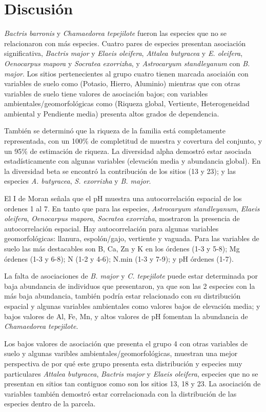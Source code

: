 \documentclass[11pt,]{article}
\begin{document}
\section{Discusión}\label{discusiuxf3n}

\emph{Bactris barronis} y \emph{Chamaedorea tepejilote} fueron las
especies que no se relacionaron con más especies. Cuatro pares de
especies presentan asociación significativa, \emph{Bactris major} y
\emph{Elaeis oleifera}, \emph{Attalea butyracea} y \emph{E. oleifera},
\emph{Oenocarpus mapora} y \emph{Socratea exorrizha}, y
\emph{Astrocaryum standleyanum} con \emph{B. major}. Los sitios
pertenecientes al grupo cuatro tienen marcada asociaión con variables de
suelo como (Potasio, Hierro, Aluminio) mientras que con otras variables
de suelo tiene valores de asociación bajos; con variables
ambientales/geomorfológicas como (Riqueza global, Vertiente,
Heterogeneidad ambiental y Pendiente media) presenta altos grados de
dependencia.

También se determinó que la riqueza de la familia está completamente
representada, con un 100\% de completitud de muestra y covertura del
conjunto, y un 95\% de estimación de riqueza. La diversidad alpha
demostró estar asociada estadísticamente con algunas variables
(elevación media y abundancia global). En la diversidad beta se encontró
la contribución de los sitios (13 y 23); y las especies \emph{A.
butyracea}, \emph{S. exorrizha} y \emph{B. major}.

El I de Moran señala que el pH muestra una autocorrelación espacial de
los ordenes 1 al 7. En tanto que para las especies, \emph{Astrocaryum
standleyanum}, \emph{Elaeis oleifera}, \emph{Oenocarpus mapora},
\emph{Socratea exorrizha}, mostraron la presencia de autocorrelación
espacial. Hay autocorrelación para algunas variables geomorfológicas:
llanura, espolón/gajo, vertiente y vaguada. Para las variables de suelo
las más destacables son B, Ca, Zn y K en los órdenes (1-3 y 5-8); Mg
órdenes (1-3 y 6-8); N (1-2 y 4-6); N.min (1-3 y 7-9); y pH órdenes
(1-7).

La falta de asociaciones de \emph{B. major} y \emph{C. tepejilote} puede
estar determinada por baja abundancia de individuos que presentaron, ya
que son las 2 especies con la más baja abundancia, también podría estar
relacionado con su distribución espacial y algunas variables ambientales
como valores bajos de elevación media; y bajos valores de Al, Fe, Mn, y
altos valores de pH fomentan la abundancia de \emph{Chamaedorea
tepejilote}.

Los bajos valores de asociación que presenta el grupo 4 con otras
variables de suelo y algunas varibles ambientales/geomorfológicas,
muestran una mejor perspectiva de por qué este grupo presenta esta
distribución y especies muy particulares \emph{Attalea butyracea},
\emph{Bactris major} y \emph{Elaeis oleifera}, especies que no se
presentan en sitios tan contiguos como son los sitios 13, 18 y 23. La
asociación de variables también demostró estar correlacionada con la
distribución de las especies dentro de la parcela.
\end{document}
